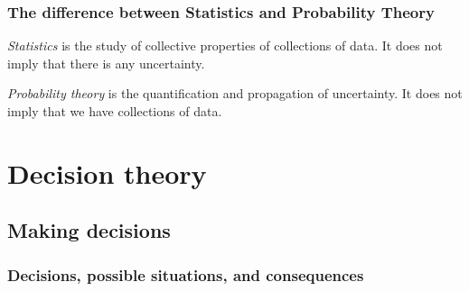 \documentclass[
  a4paper,
  DIV=11,
  numbers=noendperiod,
  oneside]{scrreprt}
\begin{document}
\providecommand{\ul}{\uline}
\renewcommand*{\|}[1][]{\nonscript\:#1\vert\nonscript\:\mathopen{}}
\providecommand*{\pr}[1]{\textsf{\small`#1'}}
\renewcommand*{\pr}[1]{\textsf{\small`#1'}}
\providecommand*{\prq}[1]{\textsf{\small #1}}

\providecommand{\se}[1]{\mathsfit{#1}}
\renewcommand{\se}[1]{\mathsfit{#1}}
\providecommand{\p}{\mathrm{p}}
\renewcommand{\p}{\mathrm{p}}
\renewcommand{\P}{\mathrm{P}}

\providecommand*{\mo}[1][=]{\mathord{\,#1\,}}
\providecommand*{\yX}{\se{X}}
\providecommand*{\yY}{\se{Y}}
\providecommand*{\yI}{\se{I}}
\providecommand{\di}{\mathrm{d}}

\hypertarget{the-difference-between-statistics-and-probability-theory}{%
\section{The difference between Statistics and Probability
Theory}\label{the-difference-between-statistics-and-probability-theory}}

\emph{Statistics} is the study of collective properties of collections
of data. It does not imply that there is any uncertainty.

\emph{Probability theory} is the quantification and propagation of
uncertainty. It does not imply that we have collections of data.

\part{Decision theory}

\hypertarget{making-decisions}{%
\chapter{Making decisions}\label{making-decisions}}

\hypertarget{decisions-possible-situations-and-consequences}{%
\section{Decisions, possible situations, and
consequences}\label{decisions-possible-situations-and-consequences}}
\end{document}
